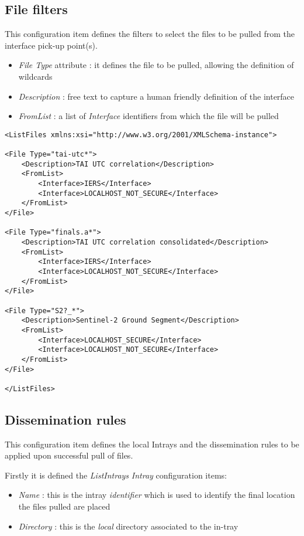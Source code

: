 \documentclass[dec_sum_main.tex]{subfiles}
\begin{document}
\subsection{File filters}
This configuration item defines the filters to select the files to be pulled from the interface pick-up point(s).
\par
\noindent
\begin{itemize}
	\item \textit{File Type} attribute : it defines the file to be pulled, allowing the definition of wildcards
	\item \textit{Description} : free text to capture a human friendly definition of the interface 
	\item \textit{FromList} : a list of \textit{Interface} identifiers from which the file will be pulled
\end{itemize}
\par
\noindent
\begin{lstlisting}
<ListFiles xmlns:xsi="http://www.w3.org/2001/XMLSchema-instance">

<File Type="tai-utc*">
	<Description>TAI UTC correlation</Description>
	<FromList>
		<Interface>IERS</Interface>
		<Interface>LOCALHOST_NOT_SECURE</Interface>
	</FromList>
</File>

<File Type="finals.a*">
	<Description>TAI UTC correlation consolidated</Description>
	<FromList>
		<Interface>IERS</Interface>
		<Interface>LOCALHOST_NOT_SECURE</Interface>
	</FromList>
</File>

<File Type="S2?_*">
	<Description>Sentinel-2 Ground Segment</Description>
	<FromList>
		<Interface>LOCALHOST_SECURE</Interface>
		<Interface>LOCALHOST_NOT_SECURE</Interface>
	</FromList>
</File>

</ListFiles>

\end{lstlisting}

\subsection{Dissemination rules}

\label{Dissemination rules}
This configuration item defines the local Intrays and the dissemination rules to be applied upon successful pull of files.
\par
\noindent
Firstly it is defined the \textit{ListIntrays} \textit{Intray} configuration items:
\par
\noindent
\begin{itemize}
	\item \textit{Name} : this is the intray \textit{identifier} which is used to identify the final location the files pulled are placed
 	\item \textit{Directory} : this is the \textit{local} directory associated to the in-tray
\end{itemize}
\end{document}
